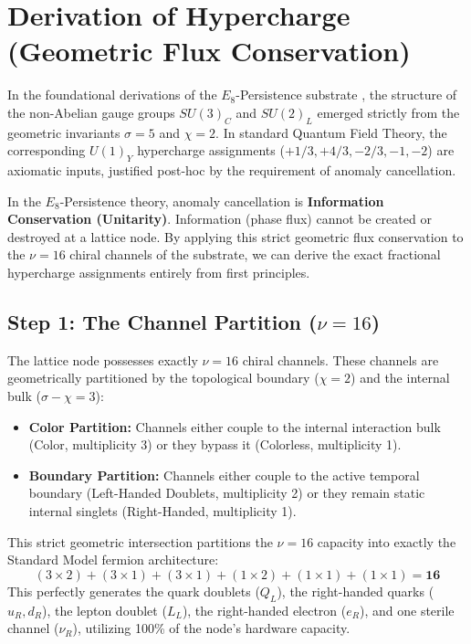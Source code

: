 \section{Derivation of Hypercharge (Geometric Flux Conservation)}
\label{app:OriginOfHypercharge}

In the foundational derivations of the $E_8$-Persistence substrate \cite{meyer_informational_2026}, the structure of the non-Abelian gauge groups $SU(3)_C$ and $SU(2)_L$ emerged strictly from the geometric invariants $\sigma=5$ and $\chi=2$. In standard Quantum Field Theory, the corresponding $U(1)_Y$ hypercharge assignments ($+1/3, +4/3, -2/3, -1, -2$) are axiomatic inputs, justified post-hoc by the requirement of anomaly cancellation.

In the $E_8$-Persistence theory, anomaly cancellation is \textbf{Information Conservation (Unitarity)}. Information (phase flux) cannot be created or destroyed at a lattice node. By applying this strict geometric flux conservation to the $\nu=16$ chiral channels of the substrate, we can derive the exact fractional hypercharge assignments entirely from first principles.

\subsection{Step 1: The Channel Partition (\texorpdfstring{$\nu=16$}{nu=16})}
The lattice node possesses exactly $\nu=16$ chiral channels. These channels are geometrically partitioned by the topological boundary ($\chi=2$) and the internal bulk ($\sigma-\chi=3$):

\begin{itemize}
    \item \textbf{Color Partition:} Channels either couple to the internal interaction bulk (Color, multiplicity 3) or they bypass it (Colorless, multiplicity 1). 
    \item \textbf{Boundary Partition:} Channels either couple to the active temporal boundary (Left-Handed Doublets, multiplicity 2) or they remain static internal singlets (Right-Handed, multiplicity 1).
\end{itemize}
This strict geometric intersection partitions the $\nu=16$ capacity into exactly the Standard Model fermion architecture: 
\begin{equation}
(3 \times 2) + (3 \times 1) + (3 \times 1) + (1 \times 2) + (1 \times 1) + (1 \times 1) = \mathbf{16}
\end{equation}
This perfectly generates the quark doublets ($Q_L$), the right-handed quarks ($u_R, d_R$), the lepton doublet ($L_L$), the right-handed electron ($e_R$), and one sterile channel ($\nu_R$), utilizing 100\% of the node's hardware capacity.

